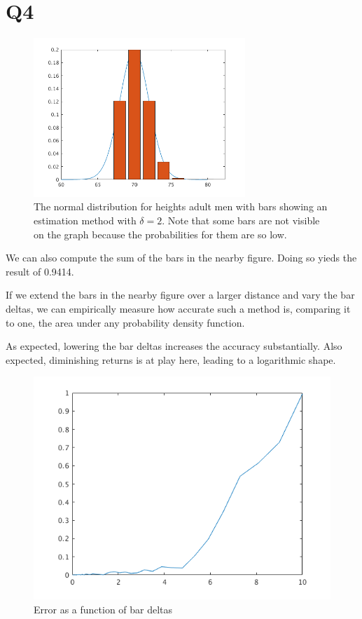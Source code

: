\documentclass{article}
\begin{document}
\section{Q4}

\begin{figure}[!ht]
	\centering
	\includegraphics[width=80mm]{normal-distr-est.png}
	\caption{The normal distribution for heights adult men with bars 
		 showing an estimation method with $\delta = 2$. Note that some 
		 bars are not visible on the graph because the probabilities 
		 for them are so low.}
\end{figure}

We can also compute the sum of the bars in the nearby figure. Doing so yieds 
the result of 0.9414.

If we extend the bars in the nearby figure over a larger distance and vary the 
bar deltas, we can empirically measure how accurate such a method is, comparing 
it to one, the area under any probability density function.

As expected, lowering the bar deltas increases the accuracy substantially. Also 
expected, diminishing returns is at play here, leading to a logarithmic shape.

\begin{figure}[!ht]
	\centering
	\includegraphics[width=160mm]{estimate-err.png}
	\caption{Error as a function of bar deltas}
\end{figure}
\end{document}
